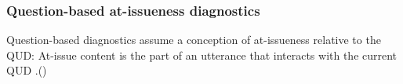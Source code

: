 \documentclass[compress, xcolor = dvipsnames, aspectratio=169]{beamer}
\begin{document}
	\begin{frame}[t]\frametitle{Question-based at-issueness diagnostics}

		Question-based diagnostics assume a conception of at-issueness relative to the QUD: At-issue content is the part of an utterance that interacts with the current QUD\newline 
		\phantom.\hfill {\scriptsize(\citealt{amaral_review_2007,simons_what_2010})}




\end{frame}
\end{document}
